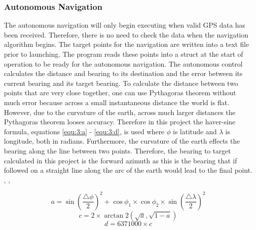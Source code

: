 \subsubsection{Autonomous Navigation}
The autonomous navigation will only begin executing when valid GPS data has been received. Therefore, there is no need to check the data when the navigation algorithm begins. The target points for the navigation are written into a text file prior to launching. The program reads these points into a struct at the start of operation to be ready for the autonomous navigation. The autonomous control calculates the distance and bearing to its destination and the error between its current bearing and its target bearing. To calculate the distance between two points that are very close together, one can use Pythagoras theorem without much error because across a small instantaneous distance the world is flat. However, due to the curvature of the earth, across much larger distances the Pythagoras theorem looses accuracy. Therefore in this project the haver-sine formula, equations \ref{equ:3:a} - \ref{equ:3:d}, is used where $\phi$ is latitude and $\lambda$ is longitude, both in radians. Furthermore, the curvature of the earth effects the bearing along the line between two points. Therefore, the bearing to target calculated in this project is the forward azimuth as this is the bearing that if followed on a straight line along the arc of the earth would lead to the final point. \cite{VanBrummelen2013}, \cite{Veness2002}, \cite{Alger1910}\par
\begin{equation}
	a = \sin{(\frac{\triangle\phi}{2})}^2 + \cos{\phi_{1}}\times\cos{\phi_{2}}\times\sin{(\frac{\triangle\lambda}{2})}^2
	\label{equ:3:a}
\end{equation}
\begin{equation}
	c = 2\times\arctan2(\sqrt{a}, \sqrt{1-a})
\end{equation}
\begin{equation}
	d = 6371000 \times c
	\label{equ:3:d}
\end{equation}
